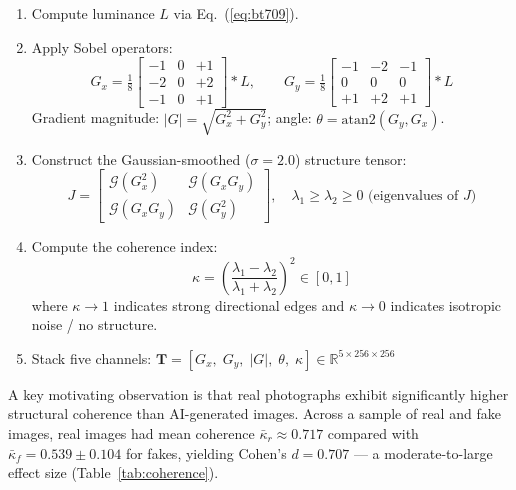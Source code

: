\documentclass[12pt, a4paper]{article}
\begin{document}
\begin{enumerate}[leftmargin=*, label=\arabic*.]
  \item Compute luminance $L$ via Eq.~(\ref{eq:bt709}).
  \item Apply Sobel operators:
        \begin{equation}
          G_x = \tfrac{1}{8}
          \begin{bmatrix}-1&0&+1\\-2&0&+2\\-1&0&+1\end{bmatrix}*L,
          \qquad
          G_y = \tfrac{1}{8}
          \begin{bmatrix}-1&-2&-1\\0&0&0\\+1&+2&+1\end{bmatrix}*L
          \label{eq:sobel}
        \end{equation}
        Gradient magnitude: $|G|=\sqrt{G_x^2+G_y^2}$;
        angle: $\theta=\mathrm{atan2}(G_y,G_x)$.
  \item Construct the Gaussian-smoothed ($\sigma=2.0$) structure tensor:
        \begin{equation}
          J = \begin{bmatrix}
            \mathcal{G}(G_x^2)    & \mathcal{G}(G_xG_y) \\
            \mathcal{G}(G_xG_y)  & \mathcal{G}(G_y^2)
          \end{bmatrix},
          \quad \lambda_1 \geq \lambda_2 \geq 0 \text{ (eigenvalues of } J)
          \label{eq:tensor}
        \end{equation}
  \item Compute the coherence index:
        \begin{equation}
          \kappa = \left(\frac{\lambda_1 - \lambda_2}{\lambda_1 + \lambda_2}\right)^2
          \in [0,1]
          \label{eq:coherence}
        \end{equation}
        where $\kappa\!\rightarrow\!1$ indicates strong directional edges and
        $\kappa\!\rightarrow\!0$ indicates isotropic noise / no structure.
  \item Stack five channels:
        $\mathbf{T} = [G_x,\;G_y,\;|G|,\;\theta,\;\kappa]
        \in \mathbb{R}^{5\times256\times256}$
\end{enumerate}

A key motivating observation is that real photographs exhibit significantly
higher structural coherence than AI-generated images.  Across a sample of
real and fake images, real images had mean coherence $\bar{\kappa}_r \approx 0.717$
compared with $\bar{\kappa}_f = 0.539\pm0.104$ for fakes, yielding Cohen's
$d = 0.707$ — a moderate-to-large effect size (Table~\ref{tab:coherence}).
\end{document}
